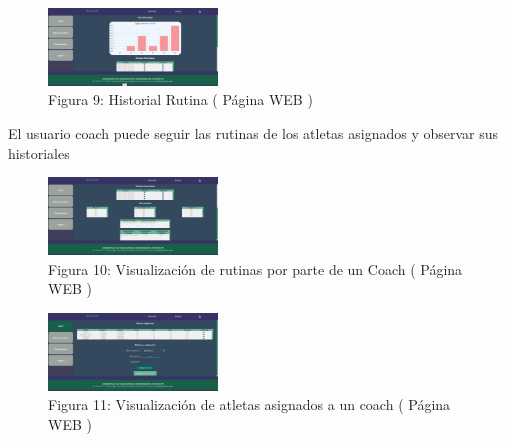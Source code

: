 \documentclass[osajnl,twocolumn,showpacs,superscriptaddress,10pt]{revtex4-1}
\begin{document}
\begin{figure} [H] \centering 
\caption{Figura 9: Historial Rutina ( Página WEB )}
\includegraphics[width=0.4\textwidth]{hist.jpg}
\end{figure}

    El usuario coach puede seguir las rutinas de los atletas asignados y observar sus historiales
    
\begin{figure} [H] \centering 
\caption{Figura 10: Visualización de rutinas por parte de un Coach ( Página WEB )}
\includegraphics[width=0.4\textwidth]{HistAtle.jpg}
\end{figure}

\begin{figure} [H] \centering 
\caption{Figura 11: Visualización de atletas asignados a un coach ( Página WEB )}
\includegraphics[width=0.4\textwidth]{AsigAtle.jpg}
\end{figure}
\end{document}
